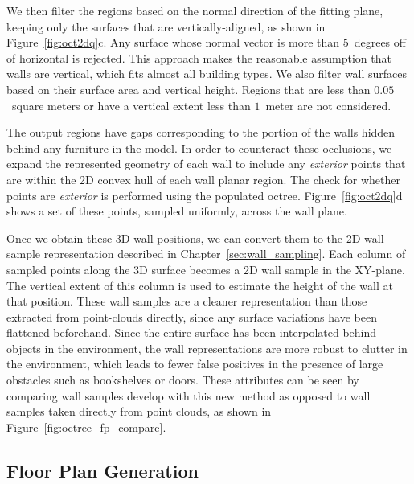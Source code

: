 \documentclass[12pt,onecolumn,oneside]{book}
\begin{document}
We then filter the regions based on the normal direction of the fitting plane, keeping only the surfaces that are vertically-aligned, as shown in Figure~\ref{fig:oct2dq}c.  Any surface whose normal vector is more than $5$~degrees off of horizontal is rejected.  This approach makes the reasonable assumption that walls are vertical, which fits almost all building types.  We also filter wall surfaces based on their surface area and vertical height.  Regions that are less than $0.05$~square meters or have a vertical extent less than $1$~meter are not considered.

The output regions have gaps corresponding to the portion of the walls hidden behind any furniture in the model.  In order to counteract these occlusions, we expand the represented geometry of each wall to include any {\it exterior} points that are within the 2D convex hull of each wall planar region.  The check for whether points are {\it exterior} is performed using the populated octree.  Figure~\ref{fig:oct2dq}d shows a set of these points, sampled uniformly, across the wall plane.  

Once we obtain these 3D wall positions, we can convert them to the 2D wall sample representation described in Chapter~\ref{sec:wall_sampling}.  Each column of sampled points along the 3D surface becomes a 2D wall sample in the XY-plane.  The vertical extent of this column is used to estimate the height of the wall at that position.  These wall samples are a cleaner representation than those extracted from point-clouds directly, since any surface variations have been flattened beforehand.  Since the entire surface has been interpolated behind objects in the environment, the wall representations are more robust to clutter in the environment, which leads to fewer false positives in the presence of large obstacles such as bookshelves or doors.  These attributes can be seen by comparing wall samples develop with this new method as opposed to wall samples taken directly from point clouds, as shown in Figure~\ref{fig:octree_fp_compare}.

\subsection{Floor Plan Generation}
\label{ssec:octree_floorplan}
\end{document}

